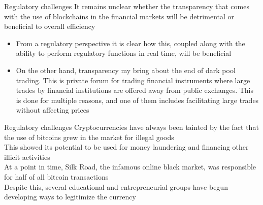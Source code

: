 \documentclass[11pt]{beamer}
\begin{document}
\begin{frame}{Regulatory challenges}
	It remains unclear whether the transparency that comes with the use of blockchains in the financial markets will be detrimental or beneficial to overall efficiency
	\begin{itemize}
		\item From a regulatory perspective it is clear how this, coupled along with the ability to perform regulatory functions in real time, will be beneficial
		\item On the other hand, transparency my bring about the end of dark pool trading. This is private forum for trading financial instruments where large trades by financial institutions are offered away from public exchanges. This is done for multiple reasons, and one of them includes facilitating large trades without affecting prices
	\end{itemize}
\end{frame}


\begin{frame}{Regulatory challenges}
	Cryptocurrencies have always been tainted by the fact that the use of bitcoins grew in the market for illegal goods\\ \vspace{3mm}
	This showed its potential to be used for money laundering and financing other illicit activities \\ \vspace{3mm} %
	At a point in time, Silk Road, the infamous online black market, was responsible for half of all bitcoin transactions\\ \vspace{3mm}
	Despite this, several educational and entrepreneurial groups have begun developing ways to legitimize the currency
\end{frame}

\end{document}
